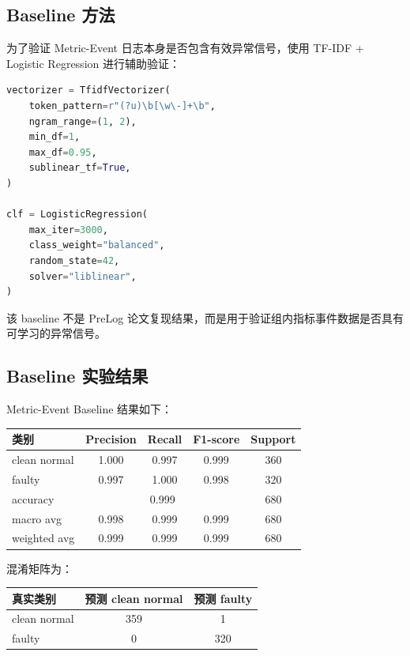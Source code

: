 \documentclass[UTF8,a4paper,12pt]{ctexart}
\begin{document}
\subsection{Baseline 方法}

为了验证 Metric-Event 日志本身是否包含有效异常信号，使用 TF-IDF + Logistic Regression 进行辅助验证：

\begin{lstlisting}[language=Python]
vectorizer = TfidfVectorizer(
    token_pattern=r"(?u)\b[\w\-]+\b",
    ngram_range=(1, 2),
    min_df=1,
    max_df=0.95,
    sublinear_tf=True,
)

clf = LogisticRegression(
    max_iter=3000,
    class_weight="balanced",
    random_state=42,
    solver="liblinear",
)
\end{lstlisting}

该 baseline 不是 PreLog 论文复现结果，而是用于验证组内指标事件数据是否具有可学习的异常信号。

\subsection{Baseline 实验结果}

Metric-Event Baseline 结果如下：

\begin{center}
\begin{tabular}{lcccc}
\toprule
类别 & Precision & Recall & F1-score & Support \\
\midrule
clean normal & 1.000 & 0.997 & 0.999 & 360 \\
faulty & 0.997 & 1.000 & 0.998 & 320 \\
accuracy & \multicolumn{3}{c}{0.999} & 680 \\
macro avg & 0.998 & 0.999 & 0.999 & 680 \\
weighted avg & 0.999 & 0.999 & 0.999 & 680 \\
\bottomrule
\end{tabular}
\end{center}

混淆矩阵为：

\begin{center}
\begin{tabular}{lcc}
\toprule
真实类别 & 预测 clean normal & 预测 faulty \\
\midrule
clean normal & 359 & 1 \\
faulty & 0 & 320 \\
\bottomrule
\end{tabular}
\end{center}
\end{document}
